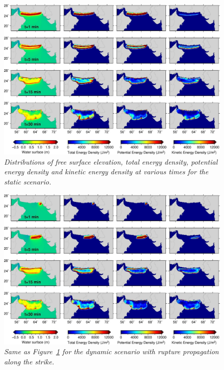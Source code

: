 \documentclass[12pt]{llncs}
\begin{document}
\begin{figure}
\centering
\includegraphics[scale=2.8]{Fig5.jpg}
\caption{\small\em Distributions of free surface elevation, total energy density, potential energy density and kinetic energy density at various times for the static scenario.}
\label{fig:en_st}
\end{figure}

\begin{figure}
\centering
\includegraphics[scale=2.8]{Fig6.jpg}
\caption{\small\em Same as Figure~\ref{fig:en_st} for the dynamic scenario with rupture propagation along the strike.}
\label{fig:en_dy_rl}
\end{figure}
\end{document}
